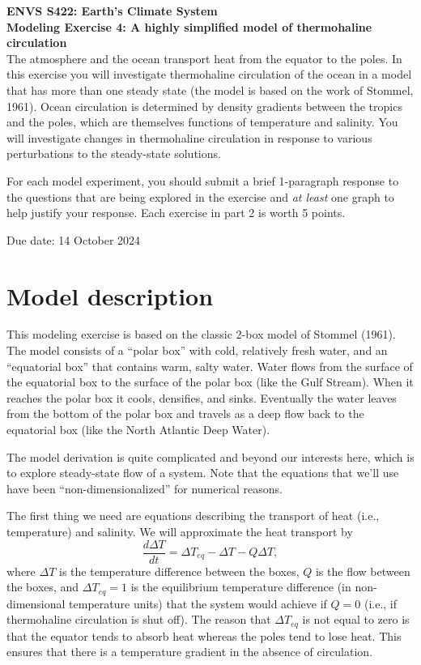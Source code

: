 \documentclass[11pt,letterpaper]{article}
\begin{document}
\setlength{\parindent}{0in}
\newcommand{\tablespace}[0]{\vspace{8pt}}
\textbf{ENVS S422: Earth's Climate System\\
Modeling Exercise 4: A highly simplified model of thermohaline circulation}\\%

The atmosphere and the ocean transport heat from the equator to the poles. In this exercise you will investigate thermohaline circulation of the ocean in a model that has more than one steady state (the model is based on the work of Stommel, 1961). Ocean circulation is determined by density gradients between the tropics and the poles, which are themselves functions of temperature and salinity. You will investigate changes in thermohaline circulation in response to various perturbations to the steady-state solutions.

For each model experiment, you should submit a brief 1-paragraph response to the questions that are being explored in the exercise and \textit{at least} one graph to help justify your response. Each exercise in part 2 is worth 5 points.

Due date: 14 October 2024

\section{Model description}
This modeling exercise is based on the classic 2-box model of Stommel (1961). The model consists of a ``polar box'' with cold, relatively fresh water, and an ``equatorial box'' that contains warm, salty water. Water flows from the surface of the equatorial box to the surface of the polar box (like the Gulf Stream). When it reaches the polar box it cools, densifies, and sinks. Eventually the water leaves from the bottom of the polar box and travels as a deep flow back to the equatorial box (like the North Atlantic Deep Water).



The model derivation is quite complicated and beyond our interests here, which is to explore steady-state flow of a system. Note that the equations that we'll use have been ``non-dimensionalized'' for numerical reasons. 

The first thing we need are equations describing the transport of heat (i.e., temperature) and salinity. We will approximate the heat transport by
\begin{equation}
\frac{d\Delta{T}}{dt}=\Delta{T_{eq}}-\Delta{T}-Q\Delta{T},
\label{eq:deltaT}
\end{equation}
where $\Delta{T}$ is the temperature difference between the boxes, $Q$ is the flow between the boxes, and $\Delta{T_{eq}}=1$ is the equilibrium temperature difference (in non-dimensional temperature units) that the system would achieve if $Q=0$ (i.e., if thermohaline circulation is shut off). The reason that $\Delta{T_{eq}}$ is not equal to zero is that the equator tends to absorb heat whereas the poles tend to lose heat. This ensures that there is a temperature gradient in the absence of circulation.
\end{document}
